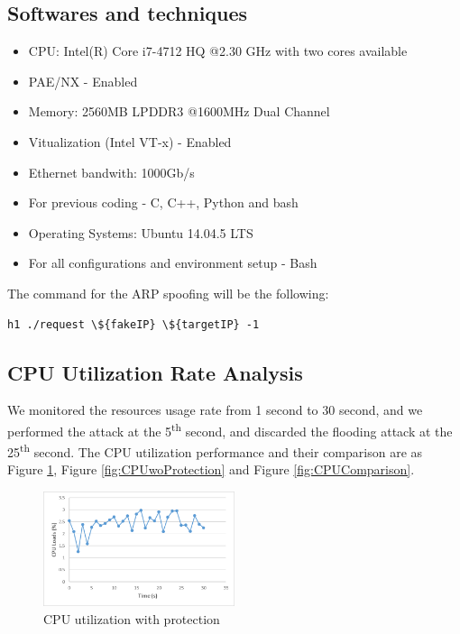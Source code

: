 \documentclass[conference]{IEEEtran}
\begin{document}
\subsection{Softwares and techniques}
\begin{itemize}
    \item CPU: Intel(R) Core i7-4712 HQ @2.30 GHz with two cores available
    \item PAE/NX - Enabled
    \item Memory: 2560MB LPDDR3 @1600MHz Dual Channel
    \item Vitualization (Intel VT-x) - Enabled
    \item Ethernet bandwith: 1000Gb/s
    \item For previous coding - C, C++, Python and bash
    \item Operating Systems: Ubuntu 14.04.5 LTS
    \item For all configurations and environment setup - Bash
\end{itemize}

The command for the ARP spoofing will be the following:
{
\tiny
\begin{verbatim} 
h1 ./request \${fakeIP} \${targetIP} -1  
\end{verbatim}
}

\subsection{CPU Utilization Rate Analysis}

We monitored the resources usage rate from 1 second to 30 second, and we performed the attack at the 5\textsuperscript{th} second, and discarded the flooding attack at the 25\textsuperscript{th} second. The CPU utilization performance and their comparison are as Figure \ref{fig:CPUwProtection}, Figure \ref{fig:CPUwoProtection} and Figure \ref{fig:CPUComparison}.

\begin{figure}[h!]
\includegraphics[width=0.5\textwidth]{CPUwProtection.png}
\caption{CPU utilization with protection}
\label{fig:CPUwProtection}
\end{figure}
\end{document}
